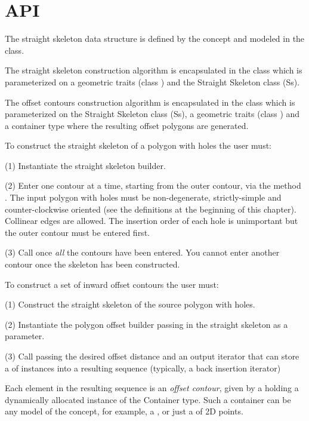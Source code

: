 \section{API}

The straight skeleton data structure is defined by the  concept and modeled in the  class.

The straight skeleton construction algorithm is encapsulated in the
class  which is
parameterized on a geometric traits (class
) and the Straight
Skeleton class (Ss).

The offset contours construction algorithm is encapsulated in the class
 which is
parameterized on the Straight Skeleton class (Ss), a
geometric traits (class )
and a container type where the resulting offset polygons are
generated.

To construct the straight skeleton of a polygon with holes the user must:
 
(1) Instantiate the straight skeleton builder.

(2) Enter one contour at a time, starting from the outer contour, via
    the method . The input polygon with holes must be 
    non-degenerate, strictly-simple and counter-clockwise oriented
    (see the definitions at the beginning of this chapter).
    Collinear edges are allowed. The insertion order of each hole
    is unimportant but the outer contour must be entered first.

(3) Call  once \textit{all} the contours have been entered. You
cannot enter another contour once the skeleton has been constructed.

To construct a set of inward offset contours the user must:
 
(1) Construct the straight skeleton of the source polygon with holes.

(2) Instantiate the polygon offset builder passing in the straight skeleton as a parameter.

(3) Call  passing the desired offset
    distance and an output iterator that can store a
     of  instances 
    into a resulting sequence (typically, a back insertion iterator)
    
Each element in the resulting sequence is an {\em offset contour}, given by
a  holding a dynamically allocated instance 
of the Container type. Such a container can be any model of the 
 concept, for example, a , 
or just a  of 2D points.

